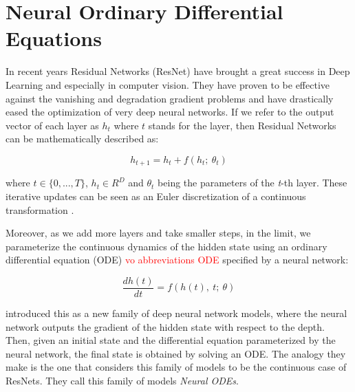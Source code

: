 \chapter{Neural Ordinary Differential Equations}

In recent years Residual Networks (ResNet) \citep{he2016deep} have brought a great success in Deep Learning and especially in computer vision. They have proven to be effective against the vanishing and degradation gradient problems and have drastically eased the optimization of very deep neural networks. If we refer to the output vector of each layer as $ h_t $ where $ t $ stands for the layer, then Residual Networks can be mathematically described as:

\begin{displaymath}
    h_{t+1} = h_{t} + f(h_{t}; \ \theta_{t})
\end{displaymath}

where $ t \in \{0, ..., T\} $, $ h_t \in R^D $ and $ \theta_t $ being the parameters of the \emph{t}-th layer. These iterative updates can be seen as an Euler discretization of a continuous transformation \citep{lu2017beyond, haber2017stable, ruthotto2018deep}.

Moreover, as we add more layers and take smaller steps, in the limit, we parameterize the continuous dynamics of the hidden state using an ordinary differential equation (ODE) \textcolor{red}{vo abbreviations ODE} specified by a neural network:

\begin{equation}
    \label{odes}
    \frac{d h(t)}{d t} = f(h(t), \ t; \ \theta )
\end{equation}

\citet{chen2018neural} introduced this as a new family of deep neural network models, where the neural network outputs the gradient of the hidden state with respect to the depth. Then, given an initial state and the differential equation parameterized by the neural network, the final state is obtained by solving an ODE. The analogy they make is the one that considers this family of models to be the continuous case of ResNets. They call this family of models \emph{Neural ODEs}.

